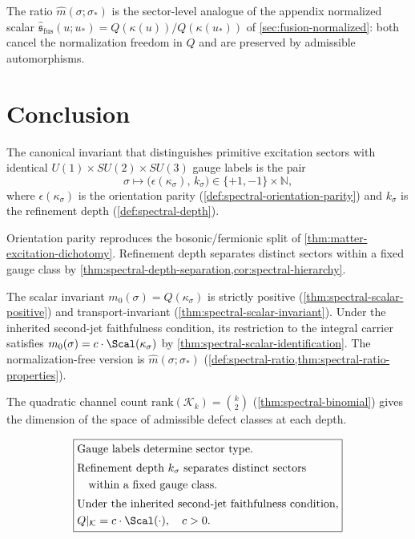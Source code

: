 \begin{remark}
\label{rem:spectral-ratio-appendix}
The ratio $\widehat{m}(\sigma;\sigma_*)$ is the sector-level analogue of
the appendix normalized scalar
$\widehat{\mathfrak s}_{\mathrm{fus}}(u;u_*) = Q(\kappa(u))/Q(\kappa(u_*))$ of
\cref{sec:fusion-normalized}: both cancel the normalization freedom in
$Q$ and are preserved by admissible automorphisms.
\end{remark}

\section{Conclusion}
\label{sec:spectral-conclusion}

The canonical invariant that distinguishes primitive excitation sectors
with identical $U(1)\times SU(2)\times SU(3)$ gauge labels is the pair
\[
  \sigma \longmapsto
  \bigl(\epsilon(\kappa_\sigma),\, k_\sigma\bigr)
  \in \{+1,-1\} \times \mathbb N,
\]
where $\epsilon(\kappa_\sigma)$ is the orientation parity
(\cref{def:spectral-orientation-parity}) and $k_\sigma$ is the
refinement depth (\cref{def:spectral-depth}).

Orientation parity reproduces the bosonic/fermionic split of
\cref{thm:matter-excitation-dichotomy}.
Refinement depth separates distinct sectors within a fixed gauge class
by \cref{thm:spectral-depth-separation,cor:spectral-hierarchy}.

The scalar invariant $m_0(\sigma) = Q(\kappa_\sigma)$ is strictly
positive (\cref{thm:spectral-scalar-positive}) and transport-invariant
(\cref{thm:spectral-scalar-invariant}).
Under the inherited second-jet faithfulness condition, its restriction
to the integral carrier satisfies
$m_0(\sigma) = c \cdot \Scal(\kappa_\sigma)$
by \cref{thm:spectral-scalar-identification}.
The normalization-free version is $\widehat{m}(\sigma;\sigma_*)$
(\cref{def:spectral-ratio,thm:spectral-ratio-properties}).

The quadratic channel count $\mathrm{rank}(\mathcal K_k) = \binom{k}{2}$
(\cref{thm:spectral-binomial}) gives the dimension of the space of
admissible defect classes at each depth.

\[
\boxed{
\begin{aligned}
&\text{Gauge labels determine sector type.} \\[2pt]
&\text{Refinement depth } k_\sigma \text{ separates distinct sectors}\\
&\quad\text{within a fixed gauge class.} \\[2pt]
&\text{Under the inherited second-jet faithfulness condition,} \\
&Q|_{\mathcal K} = c \cdot \Scal(\cdot),\quad c > 0.
\end{aligned}
}
\]